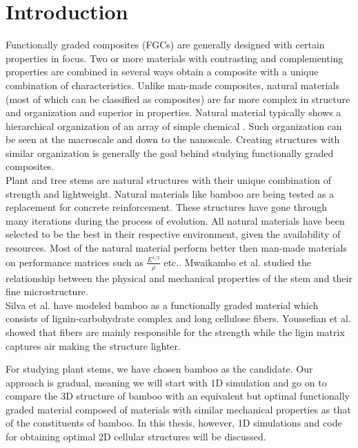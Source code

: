 \documentclass[openright,twoside]{iitkthesis}
\begin{document}
\tableofcontents
\newpage
\listoffigures

\clearpage
\chapter{Introduction}
Functionally graded composites (FGCs) are generally designed with certain properties in focus. Two or more materials with contrasting and complementing properties are combined in several ways obtain a composite with a unique combination of characteristics. Unlike man-made composites, natural materials (most of which can be classified as composites) are far more complex in structure and organization and superior in properties. Natural material typically shows a hierarchical organization of an array of simple chemical\cite{wegst2015bioinspired} . Such organization can be seen at the macroscale and down to the nanoscale. Creating structures with similar organization is generally the goal behind studying functionally graded composites. \\
Plant and tree stems are natural structures with their unique combination of strength and lightweight. Natural materials like bamboo are being tested as a replacement for concrete reinforcement\cite{bhalla2008bamboo}. These structures have gone through many iterations during the process of evolution. All natural materials have been selected to be the best in their respective environment, given the availability of resources\cite{nogata1995intelligent}. Most of the natural material perform better then man-made materials on performance matrices such as $\frac{E^{1/2}}{\rho}$ etc.\cite{ashby1995mechanical}\cite{gibson1995mechanical}. Mwaikambo et al. \cite{mwaikambo2006review} studied the relationship between the physical and mechanical properties of the stem and their fine microstructure. \\
Silva et al. \cite{silva2006modeling} have modeled bamboo as a functionally graded material which consists of lignin-carbohydrate complex and long cellulose fibers. Youssefian et al. \cite{youssefian2015molecular} showed that fibers are mainly responsible for the strength while the ligin matrix captures air making the structure lighter.\par
For studying plant stems, we have chosen bamboo as the candidate. Our approach is gradual, meaning we will start with 1D simulation and go on to compare the 3D structure of bamboo with an equivalent but optimal functionally graded material composed of materials with similar mechanical properties as that of the constituents of bamboo. In this thesis, however, 1D simulations and code for obtaining optimal 2D cellular structures will be discussed. \par
\end{document}

